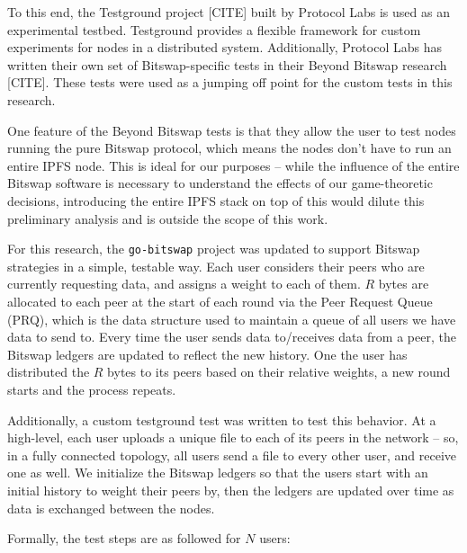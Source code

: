 To this end, the Testground project [CITE] built by Protocol Labs is used
as an experimental testbed. Testground provides a flexible framework for
custom experiments for nodes in a distributed system. Additionally, Protocol
Labs has written their own set of Bitswap-specific tests in their Beyond
Bitswap research [CITE]. These tests were used as a jumping off point for
the custom tests in this research.

One feature of the Beyond Bitswap tests
is that they allow the user to test nodes running the pure Bitswap protocol,
which means the nodes don't have to run an entire IPFS node. This is ideal
for our purposes -- while the influence of the entire Bitswap software is
necessary to understand the effects of our game-theoretic decisions,
introducing the entire IPFS stack on top of this would dilute this
preliminary analysis and is outside the scope of this work.

For this research, the \texttt{go-bitswap} project was updated to support Bitswap
strategies in a simple, testable way. Each user considers their peers
who are currently requesting data, and assigns a weight to each of them.
$R$ bytes are allocated to each peer at the start of each round via the
Peer Request Queue (PRQ), which is the data structure used to maintain a queue
of all users we have data to send to. Every time the user sends data
to/receives data from a peer, the Bitswap ledgers are updated to reflect
the new history. One the user has distributed the $R$ bytes to its peers
based on their relative weights, a new round starts and the process repeats.

Additionally, a custom testground test was written to test this behavior. At a
high-level, each user uploads a unique file to each of its peers in the network --
so, in a fully connected topology, all users send a file to every other user,
and receive one as well. We initialize the Bitswap ledgers so that the users
start with an initial history to weight their peers by, then the ledgers are
updated over time as data is exchanged between the nodes.

Formally, the test steps are as followed for $N$ users:

